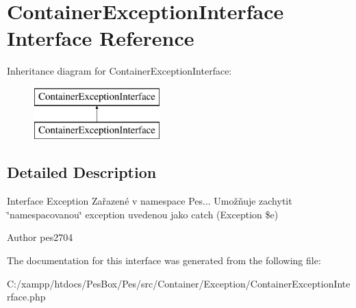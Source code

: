 \hypertarget{interface_pes_1_1_container_1_1_exception_1_1_container_exception_interface}{}\section{Container\+Exception\+Interface Interface Reference}
\label{interface_pes_1_1_container_1_1_exception_1_1_container_exception_interface}
Inheritance diagram for Container\+Exception\+Interface\+:\begin{figure}[H]
\begin{center}
\leavevmode
\includegraphics[height=2.000000cm]{interface_pes_1_1_container_1_1_exception_1_1_container_exception_interface}
\end{center}
\end{figure}


\subsection{Detailed Description}
Interface Exception Zařazené v namespace Pes... Umožňuje zachytit \char`\"{}namespacovanou\char`\"{} exception uvedenou jako catch (Exception \$e)

\begin{DoxyAuthor}{Author}
pes2704 
\end{DoxyAuthor}


The documentation for this interface was generated from the following file\+:\begin{DoxyCompactItemize}
\item 
C\+:/xampp/htdocs/\+Pes\+Box/\+Pes/src/\+Container/\+Exception/Container\+Exception\+Interface.\+php\end{DoxyCompactItemize}
